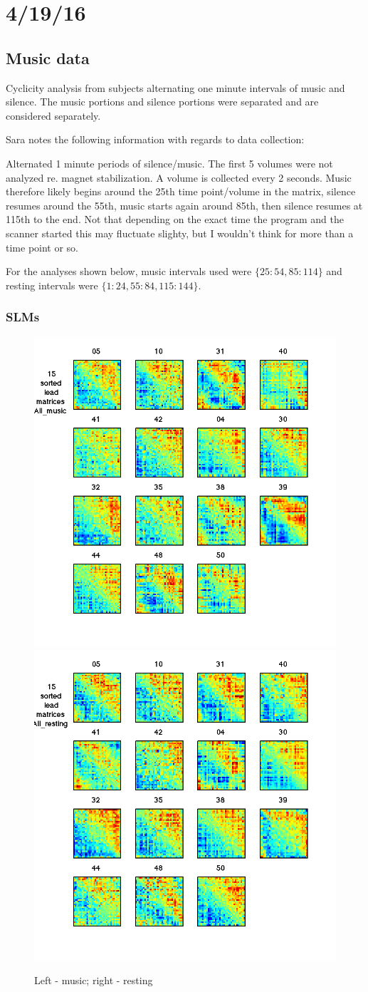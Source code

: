 \documentclass[11pt]{article}
\begin{document}
\section{4/19/16}
\subsection{Music data}
Cyclicity analysis from subjects alternating one minute intervals of music and silence. The music portions and silence portions were separated and are considered separately. 

Sara notes the following information with regards to data collection:
\begin{displayquote}
Alternated 1 minute periods of silence/music.  The first 5 volumes were not analyzed re. magnet stabilization.
A volume is collected every 2 seconds.
Music therefore likely begins around the 25th time point/volume in the matrix, silence resumes around the 55th, music starts again around 85th, then silence resumes at 115th to the end.
Not that depending on the exact time the program and the scanner started this may fluctuate slighty, but I wouldn't think for more than a time point or so.
\end{displayquote}

For the analyses shown below, music intervals used were $\{25:54, 85:114\}$ and resting intervals were $\{1:24, 55:84, 115:144\}.$

\subsubsection{SLMs}
\begin{figure}[H]
\includegraphics[width=.48\textwidth]{pictures/041916/slm_All_music.png}
\includegraphics[width=.48\textwidth]{pictures/041916/slm_All_resting.png}
\caption{Left - music; right - resting}
\end{figure}
\end{document}
